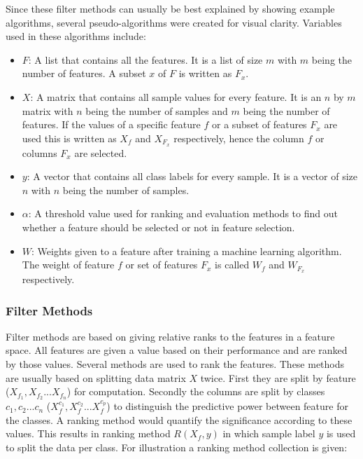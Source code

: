 \documentclass[10pt,a4paper]{article}
\begin{document}
	Since these filter methods can usually be best explained by showing example algorithms, several pseudo-algorithms were created for visual clarity. Variables used in these algorithms include:
	\begin{itemize}
		\item \textit{$F$}: A list that contains all the features. It is a list of size $m$ with $m$ being the number of features. A subset $x$ of $F$ is written as $F_x$.
		\item \textit{$X$}: A matrix that contains all sample values for every feature. It is an $n$ by $m$ matrix with $n$ being the number of samples and $m$ being the number of features. If the values of a specific feature $f$ or a subset of features $F_x$ are used this is written as $X_f$ and $X_{F_x}$ respectively, hence the column $f$ or columns $F_x$ are selected.
		\item \textit{$y$}: A vector that contains all class labels for every sample. It is a vector of size $n$ with $n$ being the number of samples.
		\item \textit{$\alpha$}: A threshold value used for ranking and evaluation methods to find out whether a feature should be selected or not in feature selection.
		\item \textit{$W$}: Weights given to a feature after training a machine learning algorithm. The weight of feature $f$ or set of features $F_x$ is called $W_f$ and $W_{F_x}$ respectively.
	\end{itemize}
	
	\subsubsection{Filter Methods}
	\label{subsec:FilterMethods}
	
	Filter methods are based on giving relative ranks to the features in a feature space. All features are given a value based on their performance and are ranked by those values\cite{Duch2006, saeys2007review}. Several methods are used to rank the features. These methods are usually based on splitting data matrix $X$ twice. First they are split by feature ($X_{f_1}, X_{f_2} ... X_{f_n}$) for computation. Secondly the columns are split by classes $c_1, c_2 ... c_n$ ($X_{f}^{c_1}, X_{f}^{c_2} ... X_{f}^{c_p}$) to distinguish the predictive power between feature for the classes. A ranking method would quantify the significance according to these values. This results in ranking method $R(X_f, y)$ in which sample label $y$ is used to split the data per class. For illustration a ranking method collection is given:
	
\end{document}

